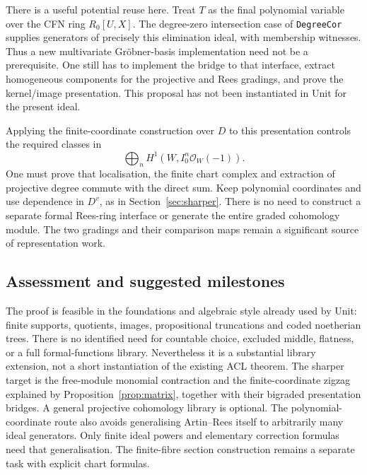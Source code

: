 \documentclass[11pt]{amsart}
\theoremstyle{definition}
\theoremstyle{remark}
\newcommand{\OO}{\mathcal O}
\newcommand{\code}[1]{\texttt{#1}}
\begin{document}
There is a useful potential reuse here. Treat $T$ as the final
polynomial variable over the CFN ring $R_0[U,X]$. The degree-zero
intersection case of \code{DegreeCor} supplies generators of precisely
this elimination ideal, with membership witnesses. Thus a new
multivariate Gr\"obner-basis implementation need not be a prerequisite.
One still has to implement the bridge to that interface, extract
homogeneous components for the projective and Rees gradings, and prove
the kernel/image presentation. This proposal has not been instantiated
in Unit for the present ideal.

Applying the finite-coordinate construction over $D$ to this
presentation controls the required classes in
\[
 \bigoplus_n H^1(W,I_0^n\OO_W(-1)).
\]
One must prove that localisation, the finite chart complex and
extraction of projective degree commute with the direct sum. Keep
polynomial coordinates and use dependence in $D^v$, as in
Section~\ref{sec:sharper}. There is no need to construct a separate
formal Rees-ring interface or generate the entire graded cohomology
module. The two gradings and their comparison maps remain a
significant source of representation work.

\subsection{Assessment and suggested milestones}
The proof is feasible in the foundations and algebraic style already
used by Unit: finite supports, quotients, images, propositional
truncations and coded noetherian trees. There is no identified need
for countable choice, excluded middle, flatness, or a full
formal-functions library. Nevertheless it is a substantial library
extension, not a short instantiation of the existing ACL theorem.
The sharper target is the free-module monomial contraction and the
finite-coordinate zigzag explained by Proposition~\ref{prop:matrix}, together with
their bigraded presentation bridges. A general projective cohomology
library is optional. The polynomial-coordinate route also avoids
generalising Artin--Rees itself to arbitrarily many ideal generators.
Only finite ideal powers and elementary correction formulas need
that generalisation. The finite-fibre section construction remains
a separate task with explicit chart formulas.
\end{document}
